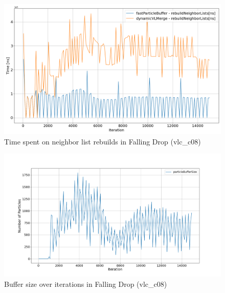 \begin{figure}[htbp]
    \centering
        \includegraphics[width=0.9\linewidth]{graphs/fallingDrop/normalExperiments/freq/vlcc08_neighbour_156.png}
        \vspace{-0.5em}
        \caption{Time spent on neighbor list rebuilds in Falling Drop (vlc\_c08)}
        \label{fig:vlcc08_neighbour_156}
\end{figure}

\begin{figure}[htbp]
    \centering
        \includegraphics[width=\linewidth]{graphs/fallingDrop/normalExperiments/freq/vlcc08_buffer_size_156.png}
        \vspace{-0.5em}

        \caption{Buffer size over iterations in Falling Drop (vlc\_c08)}
        \label{fig:vlcc08_buffer_size_156}
\end{figure}



